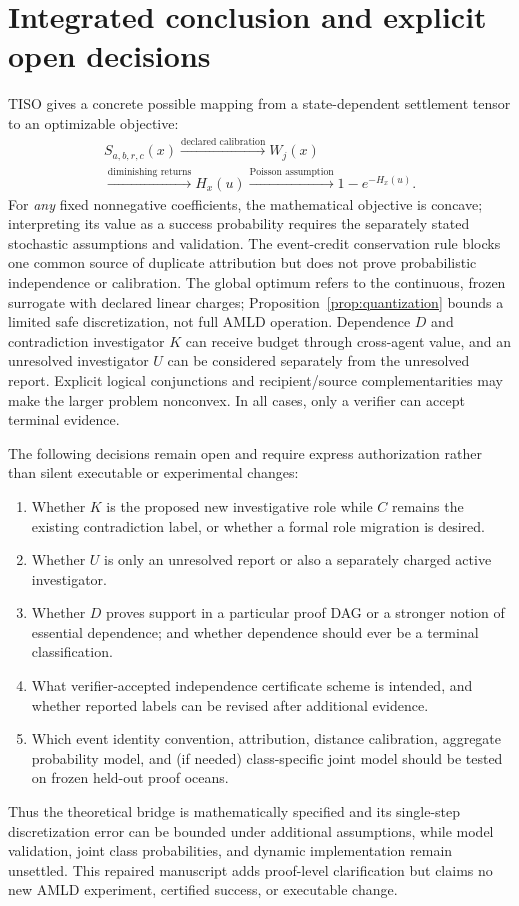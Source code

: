 \documentclass[11pt]{article}
\begin{document}
\section{Integrated conclusion and explicit open decisions}\label{sec:final}
TISO gives a concrete possible mapping from a state-dependent settlement tensor to an optimizable objective:
\[
\begin{gathered}
S_{a,b,r,c}(x)\xrightarrow{\text{declared calibration}}W_j(x)\\[3pt]
\xrightarrow{\text{diminishing returns}}H_x(u)
\xrightarrow{\text{Poisson assumption}}1-e^{-H_x(u)}.
\end{gathered}
\]
For \emph{any} fixed nonnegative coefficients, the mathematical objective is concave; interpreting its value as a success probability requires the separately stated stochastic assumptions and validation. The event-credit conservation rule blocks one common source of duplicate attribution but does not prove probabilistic independence or calibration. The global optimum refers to the continuous, frozen surrogate with declared linear charges; Proposition~\ref{prop:quantization} bounds a limited safe discretization, not full AMLD operation. Dependence $D$ and contradiction investigator $K$ can receive budget through cross-agent value, and an unresolved investigator $U$ can be considered separately from the unresolved report. Explicit logical conjunctions and recipient/source complementarities may make the larger problem nonconvex. In all cases, only a verifier can accept terminal evidence.

The following decisions remain open and require express authorization rather than silent executable or experimental changes:
\begin{enumerate}[leftmargin=*,itemsep=2pt]
\item Whether $K$ is the proposed new investigative role while $C$ remains the existing contradiction label, or whether a formal role migration is desired.
\item Whether $U$ is only an unresolved report or also a separately charged active investigator.
\item Whether $D$ proves support in a particular proof DAG or a stronger notion of essential dependence; and whether dependence should ever be a terminal classification.
\item What verifier-accepted independence certificate scheme is intended, and whether reported labels can be revised after additional evidence.
\item Which event identity convention, attribution, distance calibration, aggregate probability model, and (if needed) class-specific joint model should be tested on frozen held-out proof oceans.
\end{enumerate}
Thus the theoretical bridge is mathematically specified and its single-step discretization error can be bounded under additional assumptions, while model validation, joint class probabilities, and dynamic implementation remain unsettled. This repaired manuscript adds proof-level clarification but claims no new AMLD experiment, certified success, or executable change.
\end{document}
